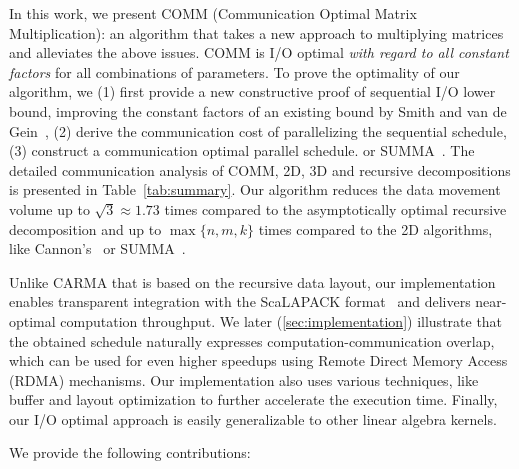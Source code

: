 \documentclass[sigplan,review,anonymous]{acmart}\settopmatter{printfolios=true,printccs=false,printacmref=false}
\newcommand\greg[1]{\textcolor{blue}{[Greg: #1]}}
\newcommand\mac[1]{\textcolor{red}{[Mac: #1]}}
\begin{document}
In this work, we present COMM (Communication Optimal Matrix Multiplication): 
an algorithm that takes a new approach to multiplying
matrices and alleviates the above issues. COMM is I/O optimal \emph{with regard 
to all constant factors}
for all combinations of parameters.
%
To prove the optimality of our algorithm,  we (1) first provide a new 
constructive proof of sequential I/O lower bound, improving the constant 
factors of an existing bound 
by Smith and van de Gein~\cite{tightMMM}, (2) derive the communication cost of  
parallelizing the sequential
schedule, (3) construct a
communication optimal parallel schedule. 
or SUMMA~\cite{summa}. The detailed communication analysis of COMM, 2D, 3D and 
recursive decompositions is
presented in Table~\ref{tab:summary}. Our algorithm reduces the data 
movement volume up to $\sqrt{3} \approx 1.73$ times compared to the 
asymptotically optimal recursive decomposition and up to 
$\max\{n,m,k\}$ times compared to the 2D
algorithms, like Cannon's~\cite{generalCannon} or SUMMA~\cite{summa}.


Unlike CARMA that is based on the recursive data layout, our implementation
enables transparent integration with the ScaLAPACK
format~\cite{scalapackLayout} and delivers near-optimal computation throughput.
%
We later (\cref{sec:implementation}) illustrate that the obtained schedule 
naturally expresses
computation-communication overlap, 
%
%
 which can 
be used for even higher speedups
using Remote Direct Memory Access (RDMA) mechanisms.
%
Our implementation
also uses various techniques, like buffer and layout optimization to further
accelerate the execution time. Finally, our I/O optimal approach is
easily generalizable to other linear algebra kernels. 

We provide the following contributions:
\end{document}
